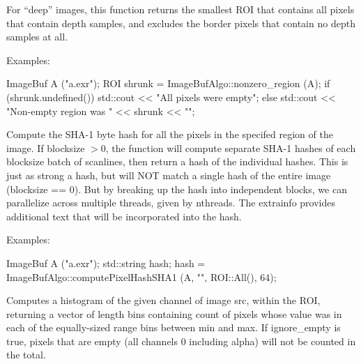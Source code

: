 For ``deep'' images, this function returns the smallest ROI that contains
all pixels that contain depth samples, and excludes the border pixels
that contain no depth samples at all.

\smallskip
\noindent Examples:
\begin{code}
    ImageBuf A ("a.exr");
    ROI shrunk = ImageBufAlgo::nonzero_region (A);
    if (shrunk.undefined())
        std::cout << "All pixels were empty\n";
    else
        std::cout << "Non-empty region was " << shrunk << "\n";
\end{code}
\apiend


 

Compute the SHA-1 byte hash for all the pixels in the specifed region of
the image.  If {\cf blocksize} $> 0$, the function will compute separate
SHA-1 hashes of each {\cf blocksize} batch of scanlines, then return a
hash of the individual hashes.  This is just as strong a hash, but will
NOT match a single hash of the entire image ({\cf blocksize == 0}).  But
by breaking up the hash into independent blocks, we can parallelize
across multiple threads, given by {\cf nthreads}.
The {\cf extrainfo} provides additional text that will be
incorporated into the hash.

\smallskip
\noindent Examples:
\begin{code}
    ImageBuf A ("a.exr");
    std::string hash;
    hash = ImageBufAlgo::computePixelHashSHA1 (A, "", ROI::All(), 64);
\end{code}
\apiend

 

Computes a histogram of the given {\cf channel} of image {\cf src}, within
the ROI, returning a vector of length {\cf bins} containing count of pixels
whose value was in each of the equally-sized range bins between {\cf min}
and {\cf max}. If {\cf ignore_empty} is {\cf true}, pixels that are empty
(all channels 0 including alpha) will not be counted in the total.

